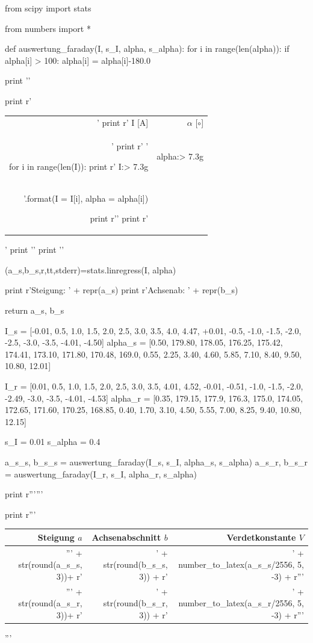 \begin{python}
from scipy import stats

from numbers import *

def auswertung_faraday(I, s_I, alpha, s_alpha):
  for i in range(len(alpha)):
    if alpha[i] > 100:
      alpha[i] = alpha[i]-180.0

  print '\n'

  print r'\begin{tabular}{rr} \toprule'
  print r' I [A] & $\alpha$ [$\circ$] \\'
  print r' \midrule '

  for i in range(len(I)):
    print r' {I:> 7.3g}  &  {alpha:> 7.3g} \\ '.format(I = I[i], alpha = alpha[i])

  print r'\bottomrule '
  print r'\end{tabular}'
  print '\n'
  print '\n'

  (a_s,b_s,r,tt,stderr)=stats.linregress(I, alpha)

  print r'Steigung: ' + repr(a_s)
  print r'Achsenab: ' + repr(b_s)

  return a_s, b_s


I_s = [-0.01, 0.5, 1.0, 1.5, 2.0, 2.5, 3.0, 3.5, 4.0, 4.47, +0.01, -0.5, -1.0, -1.5, -2.0, -2.5, -3.0, -3.5, -4.01, -4.50]
alpha_s = [0.50, 179.80, 178.05, 176.25, 175.42, 174.41, 173.10, 171.80, 170.48, 169.0, 0.55, 2.25, 3.40, 4.60, 5.85, 7.10, 8.40, 9.50, 10.80, 12.01]

I_r = [0.01, 0.5, 1.0, 1.5, 2.0, 2.5, 3.0, 3.5, 4.01, 4.52, -0.01, -0.51, -1.0, -1.5, -2.0, -2.49, -3.0, -3.5, -4.01, -4.53]
alpha_r = [0.35, 179.15, 177.9, 176.3, 175.0, 174.05, 172.65, 171.60, 170.25, 168.85, 0.40, 1.70, 3.10, 4.50, 5.55, 7.00, 8.25, 9.40, 10.80, 12.15]

s_I = 0.01
s_alpha = 0.4

a_s_s, b_s_s = auswertung_faraday(I_s, s_I, alpha_s, s_alpha)
a_s_r, b_s_r = auswertung_faraday(I_r, s_I, alpha_r, s_alpha)

print r'''\faradayDesc'''

print r'''
\begin{tabular}{rrr}
 \toprule
 Steigung $a$ & Achsenabschnitt $b$ & Verdetkonstante $V$ \\
 \midrule
''' + str(round(a_s_s, 3))+ r' & ' + str(round(b_s_s, 3)) + r' & ' + number_to_latex(a_s_s/2556, 5, -3) + r'''\\
''' + str(round(a_s_r, 3))+ r' & ' + str(round(b_s_r, 3)) + r' & ' + number_to_latex(a_s_r/2556, 5, -3) + r'''\\
 \bottomrule  
\end{tabular}
'''

\end{python}

